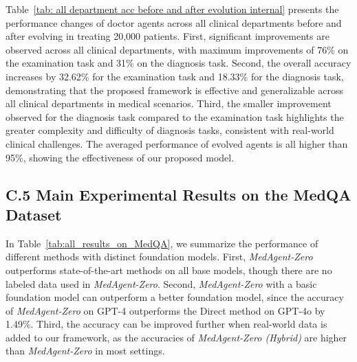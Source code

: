 \documentclass[fleqn,12pt]{wlscirep}
\begin{document}
Table~\ref{tab: all department acc before and after evolution internal} presents the performance changes of doctor agents across all clinical departments before and after evolving in treating 20,000 patients. First, significant improvements are observed across all clinical departments, with maximum improvements of 76\% on the examination task and 31\% on the diagnosis task. Second, the overall accuracy increases by 32.62\% for the examination task and 18.33\% for the diagnosis task, demonstrating that the proposed framework is effective and generalizable across all clinical departments in medical scenarios. Third, the smaller improvement observed for the diagnosis task compared to the examination task highlights the greater complexity and difficulty of diagnosis tasks, consistent with real-world clinical challenges. The averaged performance of evolved agents is all higher than 95\%, showing the effectiveness of our proposed model.



\subsection*{C.5 Main Experimental Results on the MedQA Dataset}
In Table~\ref{tab:all_results_on_MedQA}, we summarize the performance of different methods with distinct foundation models. First, \textit{MedAgent-Zero} outperforms state-of-the-art methods on all base models, though there are no labeled data used in \textit{MedAgent-Zero}. Second, \textit{MedAgent-Zero} with a basic foundation model can outperform a better foundation model, since the accuracy of \textit{MedAgent-Zero} on GPT-4 outperforms the Direct method on GPT-4o by 1.49\%. Third, the accuracy can be improved further when real-world data is added to our framework, as the accuracies of \textit{MedAgent-Zero (Hybrid)} are higher than \textit{MedAgent-Zero} in most settings.
\end{document}
